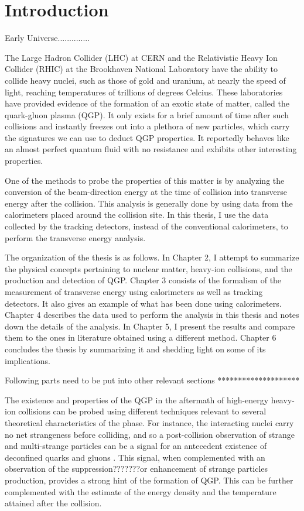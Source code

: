\chapter{Introduction} \label{ch:introduction}

Early Universe..............

The Large Hadron Collider (LHC) at CERN and the Relativistic Heavy Ion Collider (RHIC) at the Brookhaven National Laboratory have the ability to collide heavy nuclei, such as those of gold and uranium, at nearly the speed of light, reaching temperatures of trillions of degrees Celcius. These laboratories have provided evidence of the formation of an exotic state of matter, called the quark-gluon plasma (QGP). It only exists for a brief amount of time after such collisions and instantly freezes out into a plethora of new particles, which carry the signatures we can use to deduct QGP properties. It reportedly behaves like an almost perfect quantum fluid with no resistance and exhibits other interesting properties.

One of the methods to probe the properties of this matter is by analyzing the conversion of the beam-direction energy at the time of collision into transverse energy after the collision. This analysis is generally done by using data from the calorimeters placed around the collision site. In this thesis, I use the data collected by the tracking detectors, instead of the conventional calorimeters, to perform the transverse energy analysis.

The organization of the thesis is as follows. In Chapter 2, I attempt to summarize the physical concepts pertaining to nuclear matter, heavy-ion collisions, and the production and detection of QGP. Chapter 3 consists of the formalism of the measurement of transverse energy using calorimeters as well as tracking detectors. It also gives an example of what has been done using calorimeters. Chapter 4 describes the data used to perform the analysis in this thesis and notes down the details of the analysis. In Chapter 5, I present the results and compare them to the ones in literature obtained using a different method. Chapter 6 concludes the thesis by summarizing it and shedding light on some of its implications.

Following parts need to be put into other relevant sections ********************

The existence and properties of the QGP in the aftermath of high-energy heavy-ion collisions can be probed using different techniques relevant to several theoretical characteristics of the phase. For instance, the interacting nuclei  carry no net strangeness before colliding, and so a post-collision observation of strange and multi-strange particles can be a signal for an antecedent existence of deconfined quarks and gluons \cite{1742-6596-455-1-012005}. This signal, when complemented with an observation of the suppression???????or enhancement of strange particles production, provides a strong hint of the formation of QGP. This can be further complemented with the estimate of the energy density and the temperature attained after the collision.

